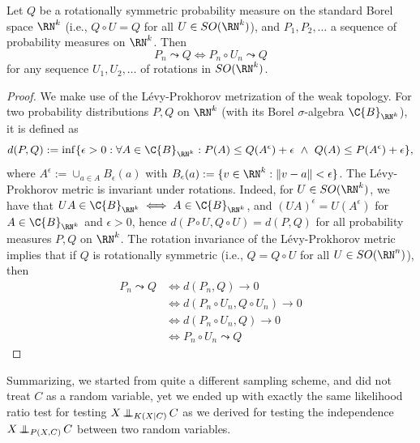 \begin{Lem}\label{lem:weak_convergence_to_rotationally_symmetric_distribution}
  Let $Q$ be a rotationally symmetric probability measure on the standard Borel space $\RN^k$ (i.e., $Q \circ U = Q$ for all $U \in SO(\RN^k)$),
  and $P_1,P_2,\dots$ a sequence of probability measures on $\RN^k$. Then
  $$P_n \leadsto Q \iff P_n \circ U_n \leadsto Q$$
  for any sequence $U_1,U_2,\dots$ of rotations in $SO(\RN^k)$.
\end{Lem}
\begin{proof}
  We make use of the L\'evy-Prokhorov metrization of the weak topology. For two probability distributions $P,Q$ on
  $\RN^k$ (with its Borel $\sigma$-algebra $\C{B}_{\RN^k}$), 
  it is defined as
  $$d(P,Q) := \inf \{ \epsilon > 0 : \forall A \in \C{B}_{\RN^k} : P(A) \le Q(A^\epsilon) + \epsilon \ \land\ Q(A) \le P(A^\epsilon) + \epsilon \},$$
  where $A^\epsilon := \cup_{a \in A} B_\epsilon(a)$ with $B_\epsilon(a) := \{v \in \RN^k : \lVert v - a \rVert < \epsilon\}$.
  The L\'evy-Prokhorov metric is invariant under rotations. 
  Indeed, for $U \in SO(\RN^k)$, we have that $UA \in \C{B}_{\RN^k} \iff A \in \C{B}_{\RN^k}$, and $(UA)^\epsilon = U(A^\epsilon)$ for $A \in \C{B}_{\RN^k}$ and $\epsilon > 0$, hence $d(P\circ U, Q\circ U) = d(P,Q)$ for all probability measures $P,Q$ on $\RN^k$. 
  The rotation invariance of the L\'evy-Prokhorov metric implies that if $Q$ is rotationally symmetric (i.e., $Q = Q \circ U$ for all $U \in SO(\RN^n)$), then
  \begin{equation*}\begin{split}
    P_n \leadsto Q 
    &\iff d(P_n,Q) \to 0 \\
    &\iff d(P_n \circ U_n,Q \circ U_n) \to 0 \\
    &\iff d(P_n \circ U_n, Q) \to 0 \\
    &\iff P_n \circ U_n \leadsto Q
  \end{split}\end{equation*}
\end{proof}

Summarizing, we started from quite a different sampling scheme, and did not treat $C$ as a random variable, yet we
ended up with exactly the same likelihood ratio test for testing $X \operatorname*{\perp\mkern-11mu\perp}_{K(X|C)} C$ as we derived 
for testing the independence $X \operatorname*{\perp\mkern-11mu\perp}_{P(X,C)} C$ between two random variables.

